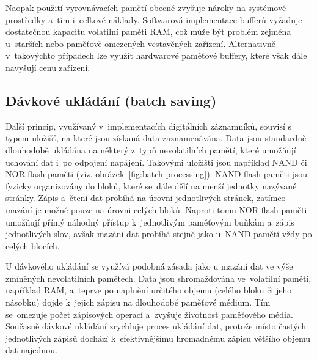 Naopak použití vyrovnávacích pamětí obecně zvyšuje nároky na systémové prostředky a~tím i~celkové náklady. Softwarová implementace bufferů vyžaduje dostatečnou kapacitu volatilní paměti RAM, což může být problém zejména u~starších nebo paměťově omezených vestavěných zařízení. Alternativně v~takovýchto případech lze využít hardwarové paměťové buffery, které však dále navyšují cenu zařízení.~\cite{multiple_buffering_batch_saving, double_buffering_model}

\newpage


\subsection{Dávkové ukládání (batch saving)}
\label{davkove_zpracovani}
Další princip, využívaný v~implementacích digitálních záznamníků, souvisí s typem uložišť, na které jsou získaná data zaznamenávána. Data jsou standardně dlouhodobě ukládána na některý z~typů nevolatilních pamětí, které umožňují uchování dat i~po odpojení napájení. Takovými uložišti jsou například NAND či NOR flash paměti (viz. obrázek~\ref{fig:batch-processing}). NAND flash paměti jsou fyzicky organizovány do bloků, které se~dále dělí na menší jednotky nazývané stránky. Zápis a~čtení dat probíhá na úrovni jednotlivých stránek, zatímco mazání je možné pouze na úrovni celých bloků.  Naproti tomu NOR flash paměti umožňují přímý náhodný přístup k~jednotlivým paměťovým buňkám a~zápis jednotlivých slov, avšak mazání dat probíhá stejně jako u~NAND pamětí vždy po celých blocích.~\cite{non_volatile_memories, ieee_relationships_among_region_segment_frame_and_cluster}

U dávkového ukládání se využívá podobná zásada jako u mazání dat ve výše zmíněných nevolatilních pamětech. Data jsou shromažďována ve~volatilní paměti, například RAM, a~teprve po naplnění určitého objemu (celého bloku či jeho násobku) dojde k~jejich zápisu na dlouhodobé paměťové médium. Tím se~omezuje počet zápisových operací a~zvyšuje životnost paměťového média. Současně dávkové ukládání zrychluje proces ukládání dat, protože místo častých jednotlivých zápisů dochází k~efektivnějšímu hromadnému zápisu většího objemu dat najednou.~\cite{non_volatile_memories, ieee_digital_sound_recorder_arm_sd_card, ieee_relationships_among_region_segment_frame_and_cluster}

